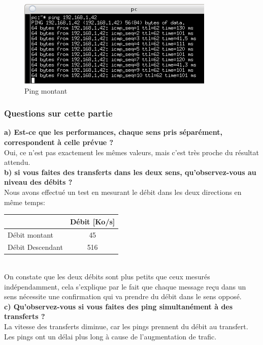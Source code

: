 \documentclass{article}
\begin{document}
\begin{figure}[h]
	\centering
	\includegraphics{./captures/pingmontant.png}
	\caption{Ping montant}
	\label{fig:token-bucket}
\end{figure}





\subsubsection{Questions sur cette partie}
\textbf{a) Est-ce que les performances, chaque sens pris séparément, correspondent à celle prévue ?}\\
Oui, ce n'est pas exactement les mêmes valeurs, mais c'est très proche du résultat attendu.
\\

\textbf{b) si vous faites des transferts dans les deux sens, qu'observez-vous au niveau des débits ?}\\
Nous avons effectué un test en mesurant le débit dans les deux directions en même temps:\\
\begin{tabular}{|l|c|}
  \hline
   & Débit [Ko/s]\\
  \hline
  Débit montant & 45 \\
  Débit Descendant & 516 \\
  \hline
\end{tabular}
\\

On constate que les deux débits sont plus petits que ceux mesurés indépendamment, cela s'explique par le fait que chaque message reçu dans un sens nécessite une confirmation qui va prendre du débit dans le sens opposé.
\\

\textbf{c) Qu'observez-vous si vous faites des ping simultanément à des transferts ?}\\
La vitesse des transferts diminue, car les pings prennent du débit au transfert. Les pings ont un délai plus long à cause de l'augmentation de trafic.
\end{document}
